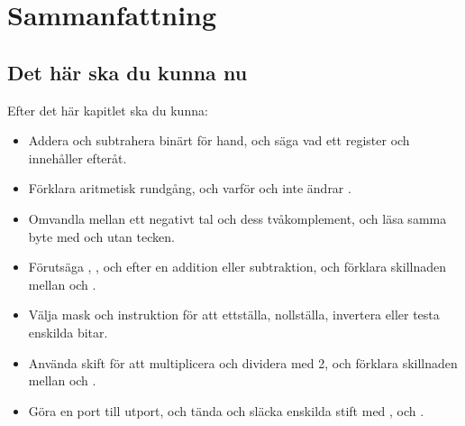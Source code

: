 
\section{Sammanfattning}
\label{c8:sec:summary}

\subsection*{Det här ska du kunna nu}
Efter det här kapitlet ska du kunna:
\begin{itemize}
  \item Addera och subtrahera binärt för hand, och säga vad ett register och  innehåller
    efteråt.
  \item Förklara aritmetisk rundgång, och varför  och  inte ändrar .
  \item Omvandla mellan ett negativt tal och dess tvåkomplement, och läsa samma byte med och utan
    tecken.
  \item Förutsäga , ,  och  efter en addition eller subtraktion,
    och förklara skillnaden mellan  och .
  \item Välja mask och instruktion för att ettställa, nollställa, invertera eller testa enskilda
    bitar.
  \item Använda skift för att multiplicera och dividera med 2, och förklara skillnaden mellan
     och .
  \item Göra en port till utport, och tända och släcka enskilda stift med , 
    och .
\end{itemize}

